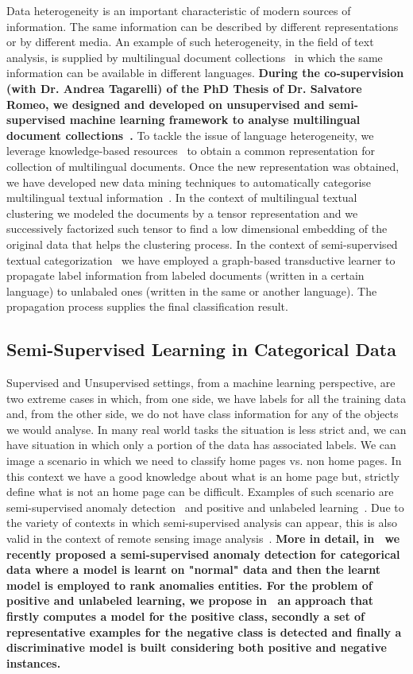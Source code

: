Data heterogeneity is an important characteristic of modern sources of information. The same information can be described by different representations or by different media. An example of such heterogeneity, in the field of text analysis, is supplied by multilingual document collections~\cite{RomeoTI14} in which the same information can be available in different languages. 
\textbf{During the co-supervision (with Dr. Andrea Tagarelli) of the PhD Thesis of Dr. Salvatore Romeo, we designed and developed on unsupervised and semi-supervised machine learning framework to analyse multilingual document collections~\cite{RomeoTI14,RomeoIT15}. }
To tackle the issue of language heterogeneity, we leverage knowledge-based resources~\cite{NavigliP10} to obtain a common representation for collection of multilingual documents. Once the new representation was obtained, we have developed new data mining techniques to automatically categorise multilingual textual information~\cite{RomeoTI14}. In the context of multilingual textual clustering we modeled the documents by a tensor representation and we successively factorized such tensor to find a low dimensional embedding of the original data that helps the clustering process. In the context of semi-supervised textual categorization~\cite{RomeoIT15} we have employed a graph-based transductive learner to propagate label information from labeled documents (written in a certain language) to unlabaled ones (written in the same or another language). The propagation process supplies the final classification result. 


\subsection{Semi-Supervised Learning in Categorical Data}

Supervised and Unsupervised settings, from a machine learning perspective, are two extreme cases in which, from one side, we have labels for all the training data and, from the other side, we do not have class information for any of the objects we would analyse. In many real world tasks the situation is less strict and, we can have situation in which only a portion of the data has associated labels. We can image a scenario in which we need to classify home pages vs. non home pages. In this context we have a good knowledge about what is an home page but, strictly define what is not an home page can be difficult. Examples of such scenario are semi-supervised anomaly detection~\cite{ChandolaBK09} and positive and unlabeled learning~\cite{LiGE11}.
Due to the variety of contexts in which semi-supervised analysis can appear, this is also valid in the context of remote sensing image analysis~\cite{Guttler16}.
\textbf{More in detail, in~\cite{iencoTNNLS16} we recently proposed a semi-supervised anomaly detection for categorical data where a model is learnt on "normal" data and then the learnt model is employed to rank anomalies entities. For the problem of positive and unlabeled learning, we propose in~\cite{iencoNeuro16} an approach that firstly computes a model for the positive class, secondly a set of representative examples for the negative class is detected and finally a discriminative model is built considering both positive and negative instances.}

